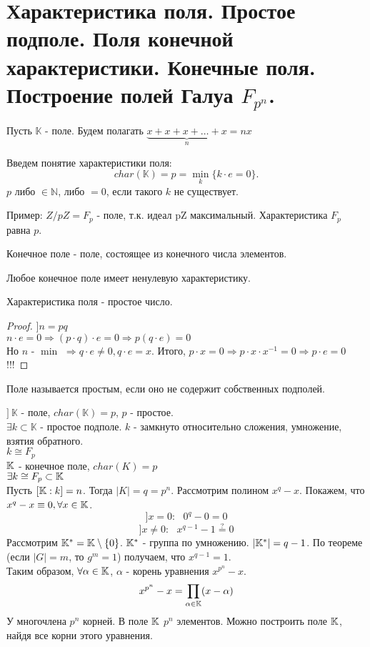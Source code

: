 \section{Характеристика поля. Простое подполе. Поля конечной характеристики. Конечные поля.
Построение полей Галуа $F_{p^n}$.}

Пусть $\mathbb{K}$ - поле.
Будем полагать $\underbrace{x + x + x + \dots + x}_{n} = nx$

Введем понятие характеристики поля:
\[char(\mathbb{K}) = p = \underset{k}{\min}\{k \cdot e = 0\}.\]
$p$ либо $\in \mathbb{N}$, либо $= 0$, если такого $k$ не существует.

Пример: $Z/pZ = F_p$ - поле, т.к. идеал pZ максимальный. Характеристика $F_p$ равна $p$.

\begin{defn}
Конечное поле - поле, состоящее из конечного числа элементов.
\end{defn}

\begin{thm}[Свойство]
Любое конечное поле имеет ненулевую характеристику.
\end{thm}

\begin{thm}[Свойство]
Характеристика поля - простое число.
\end{thm}
\begin{proof}
$] n = pq$ \\
$n \cdot e = 0 \Rightarrow (p \cdot q) \cdot e = 0 \Rightarrow p(q \cdot e) = 0$ \\
Но $n$ - $\min$ $\Rightarrow q \cdot e \neq 0, q \cdot e = x$.
Итого, $p \cdot x = 0 \Rightarrow p \cdot x \cdot x^{-1} = 0 \Rightarrow p \cdot e = 0$!!!
\end{proof}

\begin{defn}
Поле называется простым, если оно не содержит собственных подполей.
\end{defn}

$]~\mathbb{K}$ - поле, $char(\mathbb{K}) = p$, $p$ - простое.\\
$\exists k \subset \mathbb{K}$ - простое подполе. $k$ - замкнуто относительно сложения, умножение, взятия обратного.\\
$k \cong F_p$\\

$\mathbb{K}$ - конечное поле, $char(K) = p$\\
$\exists k \cong F_p \subset \mathbb{K}$\\
Пусть $[\mathbb{K}:k] = n$. Тогда $|K| = q = p^n$.
Рассмотрим полином $x^q-x$. Покажем, что $x^q - x \equiv 0, \forall x \in \mathbb{K}$.
\[]x = 0:~~~0^q - 0 = 0\]
\[]x \neq 0:~~~x^{q-1} - 1 \overset{?}{=} 0\]
Рассмотрим $\mathbb{K}^* = \mathbb{K} \setminus \{0\}$. $\mathbb{K}^*$ - группа по умножению. $|\mathbb{K}^*| = q - 1$. По теореме
(если $|G| = m$, то $g^m = 1$) получаем, что $x^{q - 1} = 1$. \\
Таким образом, $\forall \alpha \in \mathbb{K}$, $\alpha$ - корень уравнения $x^{p^n} - x$. \\
\[x^{p^n} - x = \underset{\alpha \in \mathbb{K}}{\prod}(x - \alpha)\]
У многочлена $p^n$ корней. В поле $\mathbb{K}$ $p^n$ элементов. Можно построить поле $\mathbb{K}$, найдя все корни этого
уравнения.
